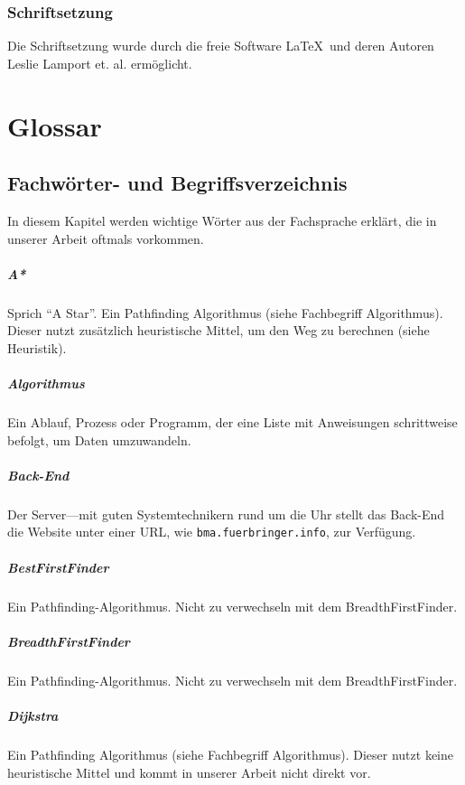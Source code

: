 \documentclass[12pt,a4paper,german]{report}
\begin{document}
\subsection{Schriftsetzung}
Die Schriftsetzung wurde durch die freie Software \LaTeX\  und deren Autoren Leslie Lamport et. al. ermöglicht.

\chapter{Glossar}
\section*{Fachwörter- und Begriffsverzeichnis}
In diesem Kapitel werden wichtige Wörter aus der Fachsprache erklärt, die in unserer Arbeit oftmals vorkommen.
\paragraph{A*} Sprich ``A Star''. Ein Pathfinding Algorithmus (siehe Fachbegriff Algorithmus). Dieser nutzt zusätzlich heuristische Mittel, um den Weg zu berechnen (siehe Heuristik).
\paragraph{Algorithmus} Ein Ablauf, Prozess oder Programm, der eine Liste mit Anweisungen schrittweise befolgt, um Daten umzuwandeln.
\paragraph{Back-End} Der Server---mit guten Systemtechnikern rund um die Uhr stellt das Back-End die Website unter einer URL, wie \texttt{bma.fuerbringer.info}, zur Verfügung.
\paragraph{BestFirstFinder} Ein Pathfinding-Algorithmus. Nicht zu verwechseln mit dem BreadthFirstFinder.
\paragraph{BreadthFirstFinder} Ein Pathfinding-Algorithmus. Nicht zu verwechseln mit dem BreadthFirstFinder.
\paragraph{Dijkstra} Ein Pathfinding Algorithmus (siehe Fachbegriff Algorithmus). Dieser nutzt keine heuristische Mittel und kommt in unserer Arbeit nicht direkt vor.
\end{document}
